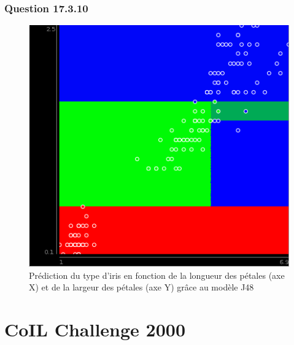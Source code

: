 \documentclass[10pt,a4paper]{article}
\begin{document}
			\subsubsection*{Question 17.3.10}
			
			\begin{figure}[h]
				\centering
				\includegraphics[width=.5\textwidth]{iris_J48}
				\caption{Prédiction du type d'iris en fonction de la longueur des pétales (axe X) et de la largeur des pétales (axe Y) grâce au modèle J48}
				\label{fig:iris:J48}
			\end{figure}
   	
   	\section{CoIL Challenge 2000}
   	
          	
\end{document}
